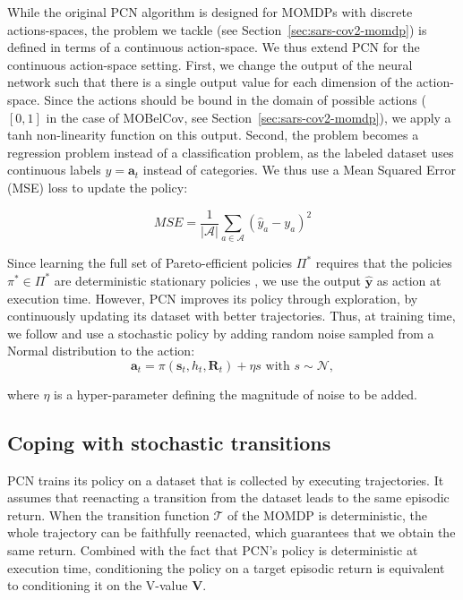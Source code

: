\documentclass{article}
\renewcommand{\cite}[1]{\citep{#1}}
\newcommand{\mdpstate}{\mathbf{s}}
\newcommand{\momdpreturn}{\mathbf{R}}
\newcommand{\mdpaction}{\mathbf{a}}
\newcommand{\momdpname}{MOBelCov}
\begin{document}
While the original PCN algorithm is designed for MOMDPs with discrete actions-spaces, the problem we tackle (see Section~\ref{sec:sars-cov2-momdp}) is defined in terms of a continuous action-space. We thus extend PCN for the continuous action-space setting.
First, we change the output of the neural network such that there is a single output value for each dimension of the action-space. Since the actions should be bound in the domain of possible actions ($[0,1]$ in the case of \momdpname, see Section~\ref{sec:sars-cov2-momdp}), we apply a tanh non-linearity function on this output.
Second, the problem becomes a regression problem instead of a classification problem, as the labeled dataset uses continuous labels $y = \mdpaction_t$ instead of categories. We thus use a Mean Squared Error (MSE) loss to update the policy:

\begin{equation}
    MSE = \frac{1}{|\mathcal{A}|}\sum_{a \in \mathcal{A}}{(\hat{y}_a - y_a)^2}
\end{equation}

Since learning the full set of Pareto-efficient policies $\Pi^*$ requires that the policies $\pi^* \in \Pi^*$ are deterministic stationary policies \cite{roijers2013survey}, we use the output $\mathbf{\hat{y}}$ as action at execution time. However, PCN improves its policy through exploration, by continuously updating its dataset with better trajectories. Thus, at training time, we follow \cite{lillicrap2015continuous} and use a stochastic policy by adding random noise sampled from a Normal distribution to the action: 
\begin{equation}
    \mdpaction_t = \pi(\mdpstate_t, h_t, \momdpreturn_t) + \eta s \text { with } s \sim \mathcal{N},
\end{equation}

where $\eta$ is a hyper-parameter defining the magnitude of noise to be added.

\subsection{Coping with stochastic transitions}

PCN trains its policy on a dataset that is collected by executing trajectories. It assumes that reenacting a transition from the dataset leads to the same episodic return. When the transition function $\mathcal{T}$ of the MOMDP is deterministic, the whole trajectory can be faithfully reenacted, which guarantees that we obtain the same return. Combined with the fact that PCN's policy is deterministic at execution time, conditioning the policy on a target episodic return is equivalent to conditioning it on the V-value $\mathbf{V}$.
\end{document}
